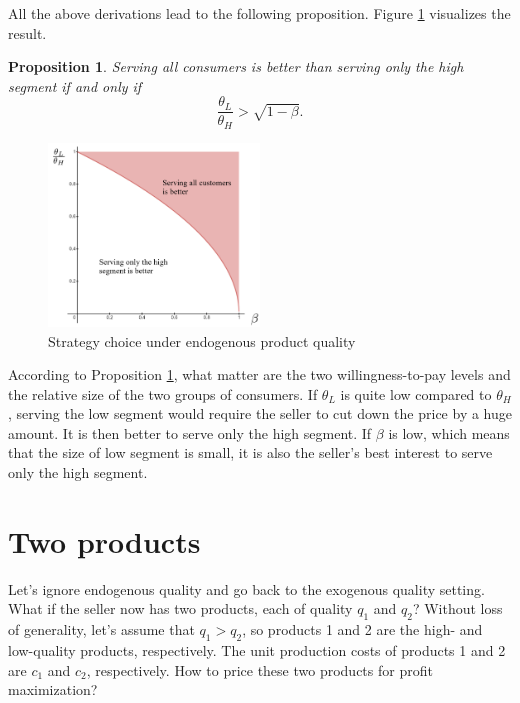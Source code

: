 \documentclass[11pt,a4paper]{article}
\newtheorem{prop}{Proposition}
\begin{document}
All the above derivations lead to the following proposition. Figure \ref{fig:strategy} visualizes the result. 

\begin{prop}\label{prop:strategy}
Serving all consumers is better than serving only the high segment if and only if 
\[
	\frac{\theta_L}{\theta_H} > \sqrt{1 - \beta}.
\]
\end{prop}

\begin{figure}[hbt]
\centering
\includegraphics[width=0.5\textwidth]{figures/strategy}
\caption{Strategy choice under endogenous product quality}
\label{fig:strategy}
\end{figure}

According to Proposition \ref{prop:strategy}, what matter are the two willingness-to-pay levels and the relative size of the two groups of consumers. If $\theta_L$ is quite low compared to $\theta_H$, serving the low segment would require the seller to cut down the price by a huge amount. It is then better to serve only the high segment. If $\beta$ is low, which means that the size of low segment is small, it is also the seller's best interest to serve only the high segment. 











\section{Two products}

Let's ignore endogenous quality and go back to the exogenous quality setting. 
What if the seller now has two products, each of quality $q_1$ and $q_2$? 
Without loss of generality, let's assume that $q_1 > q_2$, 
so products 1 and 2 are the high- and low-quality products, respectively. 
The unit production costs of products 1 and 2 are $c_1$ and $c_2$, respectively. 
How to price these two products for profit maximization? 
\end{document}
